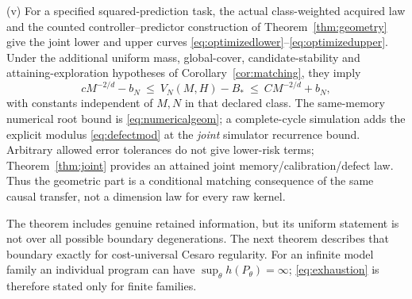\begin{theorem}
\textup{(v)} For a specified squared-prediction task, the actual class-weighted acquired law and the counted controller--predictor construction of Theorem~\ref{thm:geometry} give the joint lower and upper curves \eqref{eq:optimizedlower}--\eqref{eq:optimizedupper}. Under the additional uniform mass, global-cover, candidate-stability and attaining-exploration hypotheses of Corollary~\ref{cor:matching}, they imply
\begin{equation}\label{eq:centralgeometry}
 cM^{-2/d}-b_N\ \le\ V_N(M,H)-B_*\ \le\ CM^{-2/d}+b_N,
\end{equation}
with constants independent of $M,N$ in that declared class. The same-memory numerical root bound is \eqref{eq:numericalgeom}; a complete-cycle simulation adds the explicit modulus \eqref{eq:defectmod} at the \emph{joint} simulator recurrence bound. Arbitrary allowed error tolerances do not give lower-risk terms; Theorem~\ref{thm:joint} provides an attained joint memory/calibration/defect law. Thus the geometric part is a conditional matching consequence of the same causal transfer, not a dimension law for every raw kernel.
\end{theorem}

The theorem includes genuine retained information, but its uniform statement is not over all possible boundary degenerations. The next theorem describes that boundary exactly for cost-universal Cesaro regularity. For an infinite model family an individual program can have $\sup_\theta h(P_\theta)=\infty$; \eqref{eq:exhaustion} is therefore stated only for finite families.
